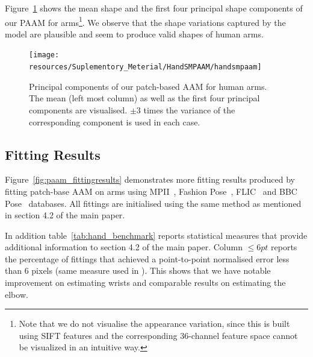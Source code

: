 Figure~\ref{fig:paam_sm} shows the mean shape and the first four principal shape components of our PAAM for arms\footnote{Note that we do not visualise the appearance variation, since this is built using SIFT features and the corresponding 36-channel feature space cannot be visualized in an intuitive way.}. We observe that the shape variations captured by the model are plausible and seem to produce valid shapes of human arms.

\begin{figure}[!t]
\centering
\texttt{[image: resources/Suplementory\_Meterial/HandSMPAAM/handsmpaam]}
\caption{Principal components of our patch-based AAM for human arms.  The mean (left most column) as well as the first four principal components are visualised. $\pm 3$ times the variance of the corresponding component is used in each case.}
\label{fig:paam_sm}
\end{figure}




\subsection{Fitting Results}
\label{sec:paam_fittingresults}


Figure~\ref{fig:paam_fittingresults} demonstrates more fitting results produced by fitting patch-base AAM on arms using MPII~\cite{andriluka14cvpr}, Fashion Pose~\cite{dantone2013human}, FLIC~\cite{sapp2013modec} and BBC Pose~\cite{pfister2015flowing} databases. All fittings are initialised using the same method as mentioned in section 4.2 of the main paper.


In addition table~\ref{tab:hand_benchmark} reports statistical measures that provide additional information to section 4.2 of the main paper. Column $\leq 6pt$ reports the percentage of fittings that achieved a point-to-point normalised error less than 6 pixels (same measure used in \cite{pfister2015flowing}). This shows that we have notable improvement on estimating wrists and comparable results on estimating the elbow.


